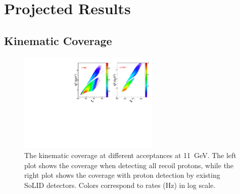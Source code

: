\section{Projected Results}

\subsection{Kinematic Coverage}

\begin{figure}[!ht]
 \begin{center}
      \includegraphics[type=pdf,
        ext=.pdf,read=.pdf,width=0.6\textwidth]{./figures/E11_Q2_x_epip_Q2gt1}
 \caption[The kinematic coverage at different acceptances.]{\footnotesize{The
     kinematic coverage at different acceptances at 11~GeV. The left plot
     shows the coverage when detecting all recoil protons, while the right plot
     shows the coverage with proton detection by existing SoLID
     detectors. Colors correspond to rates (Hz) in log scale.}}
  \label{kin_cor}
  \end{center}
\end{figure}

